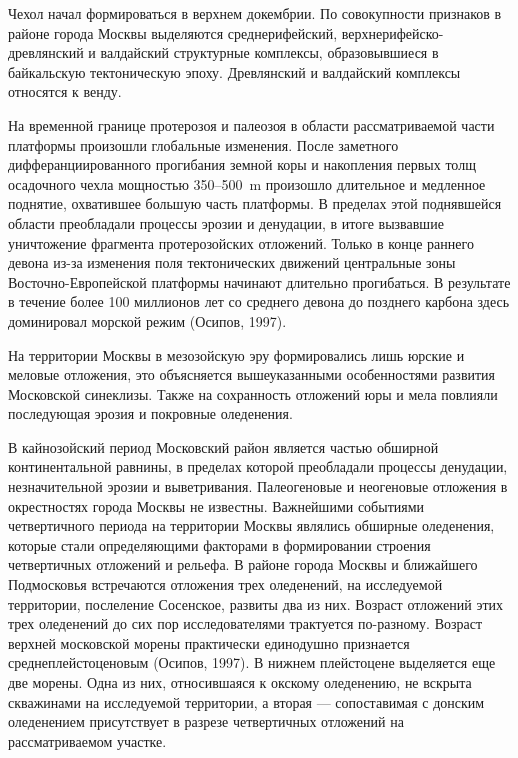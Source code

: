 Чехол начал формироваться в верхнем докембрии. По совокупности 
признаков в районе города Москвы выделяются среднерифейский, верхнерифейско-древлянский 
и валдайский структурные комплексы, образовывшиеся в байкальскую тектоническую эпоху. 
Древлянский и валдайский комплексы относятся к венду.

На временной границе протерозоя и палеозоя в области рассматриваемой части платформы 
произошли глобальные изменения. После заметного 
дифферанциированного прогибания земной коры и накопления первых толщ осадочного чехла
мощностью 350--500~\si{\meter} произошло длительное и медленное поднятие, охватившее
большую часть платформы. В пределах этой поднявшейся области преобладали процессы 
эрозии и денудации, в итоге вызвавшие уничтожение фрагмента протерозойских отложений. 
Только в конце раннего девона из-за изменения поля тектонических движений центральные 
зоны Восточно-Европейской платформы
начинают длительно прогибаться.
В результате в течение более 100 миллионов лет 
со среднего девона до позднего карбона здесь доминировал морской режим (Осипов, 1997).

На территории Москвы в мезозойскую эру формировались лишь юрские и меловые отложения, это объясняется 
вышеуказанными особенностями развития Московской синеклизы. Также на сохранность 
отложений юры и мела повлияли последующая эрозия и покровные оледенения.

В кайнозойский период Московский район является частью обширной континентальной равнины,
в пределах которой преобладали процессы денудации, незначительной эрозии и выветривания.
Палеогеновые и неогеновые отложения в окрестностях города Москвы не известны.
Важнейшими событиями четвертичного периода на территории Москвы являлись обширные оледенения, 
которые стали определяющими факторами в формировании 
строения четвертичных отложений и рельефа.
В районе города Москвы и ближайшего Подмосковья встречаются отложения трех оледенений, 
на исследуемой территории,
послеление Сосенское, развиты два из них. 
Возраст отложений этих трех оледенений до сих пор исследователями трактуется по-разному.
Возраст верхней московской морены практически единодушно признается среднеплейстоценовым (Осипов, 1997). 
В нижнем плейстоцене выделяется еще две морены.
Одна из них, относившаяся к окскому оледенению, не вскрыта скважинами на исследуемой территории, 
а вторая --- сопоставимая с донским оледенением присутствует в разрезе четвертичных отложений 
на рассматриваемом участке.


